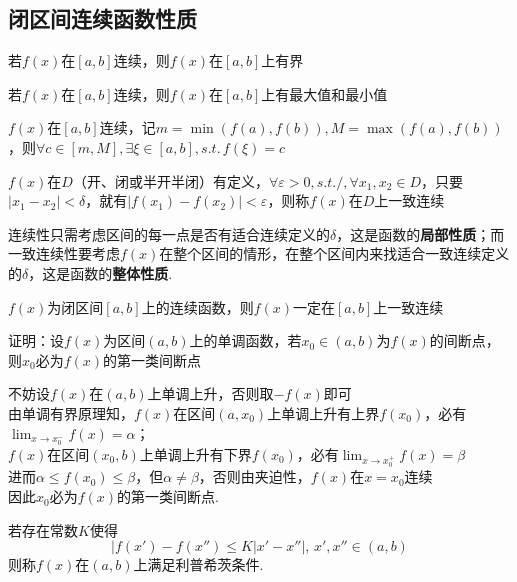 \subsection{闭区间连续函数性质}
\label{sec:sub:continuous_function_properties}
\begin{theorem}[有界性定理]
若$f(x)$在$[a,b]$连续，则$f(x)$在$[a,b]$上有界
\end{theorem}
\begin{theorem}[最值定理]
若$f(x)$在$[a,b]$连续，则$f(x)$在$[a,b]$上有最大值和最小值
\end{theorem}
\begin{theorem}[介值定理]
\par $f(x)$在$[a,b]$连续，记$m=\min(f(a),f(b)),M=\max(f(a),f(b))$，则$\forall c\in[m,M],\exists \xi\in[a,b],s.t.\,f(\xi)=c$
\end{theorem}
\begin{definition}[一致连续]
$f(x)$在$D$（开、闭或半开半闭）有定义，$\forall \varepsilon>0,s.t./,\forall x_1,x_2\in D$，只要$|x_1-x_2|<\delta$，就有$|f(x_1)-f(x_2)|<\varepsilon$，则称$f(x)$在$D$上一致连续
\end{definition}
连续性只需考虑区间的每一点是否有适合连续定义的$\delta$，这是函数的\textbf{局部性质}；而一致连续性要考虑$f(x)$在整个区间的情形，在整个区间内来找适合一致连续定义的$\delta$，这是函数的\textbf{整体性质}.
\begin{theorem}[康托(Cantor)定理]
\label{thm:cantor}
$f(x)$为闭区间$[a,b]$上的连续函数，则$f(x)$一定在$[a,b]$上一致连续
\end{theorem}
\begin{example}
\label{conti1}
证明：设$f(x)$为区间$(a,b)$上的单调函数，若$x_0\in(a,b)$为$f(x)$的间断点，则$x_0$必为$f(x)$的第一类间断点
\end{example}
\begin{analysis}
不妨设$f(x)$在$(a,b)$上单调上升，否则取$-f(x)$即可\\
由单调有界原理知，$f(x)$在区间$(a,x_0)$上单调上升有上界$f(x_0)$，必有$\displaystyle\lim_{x\to x_0^-}f(x)=\alpha$；\\
$f(x)$在区间$(x_0,b)$上单调上升有下界$f(x_0)$，必有$\displaystyle\lim_{x\to x_0^+}f(x)=\beta$\\
进而$\alpha\leq f(x_0)\leq\beta$，但$\alpha\ne\beta$，否则由夹迫性，$f(x)$在$x=x_0$连续\\
因此$x_0$必为$f(x)$的第一类间断点.
\end{analysis}
\begin{definition}
若存在常数$K$使得
\[|f(x')-f(x'')\leq K|x'-x''|,\,x',x''\in(a,b)\]
则称$f(x)$在$(a,b)$上满足利普希茨条件.
\end{definition}
